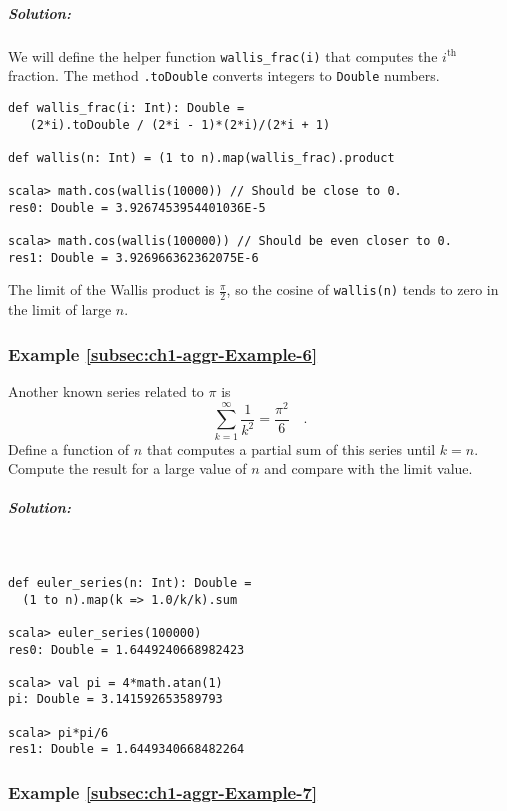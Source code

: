 \subparagraph{Solution:}

We will define the helper function \lstinline!wallis_frac(i)!
that computes the $i^{\text{th}}$ fraction. The method \texttt{}\lstinline!.toDouble!
converts integers to \texttt{}\lstinline!Double!
numbers.
\begin{lstlisting}
def wallis_frac(i: Int): Double =
   (2*i).toDouble / (2*i - 1)*(2*i)/(2*i + 1)

def wallis(n: Int) = (1 to n).map(wallis_frac).product

scala> math.cos(wallis(10000)) // Should be close to 0.
res0: Double = 3.9267453954401036E-5

scala> math.cos(wallis(100000)) // Should be even closer to 0.
res1: Double = 3.926966362362075E-6
\end{lstlisting}
The limit of the Wallis product is $\frac{\pi}{2}$, so the cosine
of \lstinline!wallis(n)!
tends to zero in the limit of large $n$.

\subsubsection{Example \label{subsec:ch1-aggr-Example-6}\ref{subsec:ch1-aggr-Example-6}}

Another known series related to $\pi$ is
\[
\sum_{k=1}^{\infty}\frac{1}{k^{2}}=\frac{\pi^{2}}{6}\quad.
\]
Define a function of $n$ that computes a partial sum of this series
until $k=n$. Compute the result for a large value of $n$ and compare
with the limit value.

\subparagraph{Solution:}

~

\begin{lstlisting}
def euler_series(n: Int): Double = 
  (1 to n).map(k => 1.0/k/k).sum

scala> euler_series(100000)
res0: Double = 1.6449240668982423

scala> val pi = 4*math.atan(1)
pi: Double = 3.141592653589793

scala> pi*pi/6
res1: Double = 1.6449340668482264 
\end{lstlisting}

\subsubsection{Example \label{subsec:ch1-aggr-Example-7}\ref{subsec:ch1-aggr-Example-7}}

